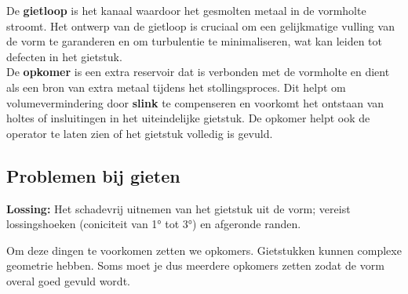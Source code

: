 \documentclass[a4paper,11pt,twoside]{report}
\begin{document}
\begin{conceptbox}
    De \textbf{gietloop} is het kanaal waardoor het gesmolten metaal in de vormholte stroomt.
    Het ontwerp van de gietloop is cruciaal om een gelijkmatige vulling van de vorm te garanderen en om turbulentie te minimaliseren,
    wat kan leiden tot defecten in het gietstuk.\\

    De \textbf{opkomer} is een extra reservoir dat is verbonden met de vormholte en dient als een bron van extra metaal tijdens het stollingsproces.
    Dit helpt om volumevermindering door \textbf{slink} te compenseren en voorkomt het ontstaan van holtes of insluitingen in het uiteindelijke gietstuk.
    De opkomer helpt ook de operator te laten zien of het gietstuk volledig is gevuld.
\end{conceptbox}

\subsection{Problemen bij gieten}
\noindent\textbf{Lossing:} Het schadevrij uitnemen van het gietstuk uit de vorm; vereist lossingshoeken (coniciteit van 1° tot 3°) en afgeronde randen.

Om deze dingen te voorkomen zetten we opkomers. Gietstukken kunnen complexe geometrie hebben.
Soms moet je dus meerdere opkomers zetten zodat de vorm overal goed gevuld wordt.
\end{document}
